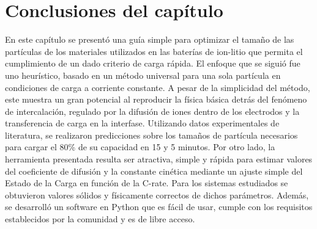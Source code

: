 \section{Conclusiones del capítulo}

En este capítulo se presentó una guía simple para optimizar el tamaño de las 
partículas de los materiales utilizados en las baterías de ion-litio que permita
el cumplimiento de un dado criterio de carga rápida. El enfoque que se siguió
fue uno heurístico, basado en un método universal para una sola partícula en
condiciones de carga a corriente constante. A pesar de la simplicidad del método, 
este muestra un gran potencial al reproducir la física básica detrás del 
fenómeno de intercalación, regulado por la difusión de iones dentro de los 
electrodos y la transferencia de carga en la interfase. Utilizando datos 
experimentales de literatura, se realizaron predicciones sobre los tamaños de
partícula necesarios para cargar el 80\% de su capacidad en 15 y 5 minutos. 
Por otro lado, la herramienta presentada resulta ser atractiva, simple y rápida 
para estimar valores del coeficiente de difusión y la constante cinética mediante
un ajuste simple del Estado de la Carga en función de la C-rate. Para los 
sistemas estudiados se obtuvieron valores sólidos y físicamente correctos de
dichos parámetros. Además, se desarrolló un software en Python que es fácil 
de usar, cumple con los requisitos establecidos por la comunidad y es de libre
acceso.
